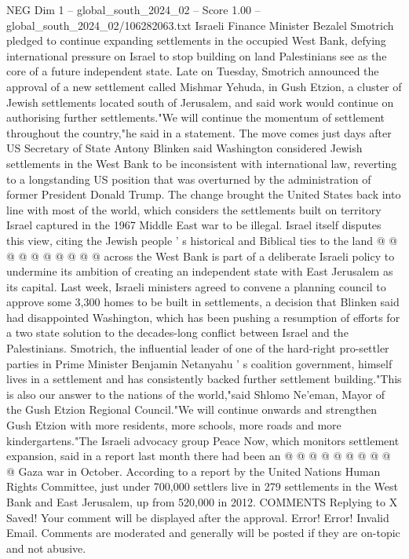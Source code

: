 \begin{textsample}{NEG Dim 1 – global\_south\_2024\_02 – Score 1.00 – global\_south\_2024\_02/106282063.txt}  \label{ex:f1_neg_419}
Israeli Finance Minister Bezalel Smotrich pledged to continue expanding settlements in the occupied West Bank, defying international pressure on Israel to stop building on land Palestinians see as the core of a future independent state.
Late on Tuesday, Smotrich announced the approval of a new settlement called Mishmar Yehuda, in Gush Etzion, a cluster of Jewish settlements located south of Jerusalem, and said work would continue on authorising further settlements."We will continue the momentum of settlement throughout the country,"he said in a statement.
The move comes just days after US Secretary of State Antony Blinken said Washington considered Jewish settlements in the West Bank to be inconsistent with international law, reverting to a longstanding US position that was overturned by the administration of former President Donald Trump.
The change brought the United States back into line with most of the world, which considers the settlements built on territory Israel captured in the 1967 Middle East war to be illegal.
Israel itself disputes this view, citing the Jewish people ' s historical and Biblical ties to the land @ @ @ @ @ @ @ @ @ @ across the West Bank is part of a deliberate Israeli policy to undermine its ambition of creating an independent state with East Jerusalem as its capital.
Last week, Israeli ministers agreed to convene a planning council to approve some 3,300 homes to be built in settlements, a decision that Blinken said had disappointed Washington, which has been pushing a resumption of efforts for a two state solution to the decades-long conflict between Israel and the Palestinians.
Smotrich, the influential leader of one of the hard-right pro-settler parties in Prime Minister Benjamin Netanyahu ' s coalition government, himself lives in a settlement and has consistently backed further settlement building."This is also our answer to the nations of the world,"said Shlomo Ne'eman, Mayor of the Gush Etzion Regional Council."We will continue onwards and strengthen Gush Etzion with more residents, more schools, more roads and more kindergartens."The Israeli advocacy group Peace Now, which monitors settlement expansion, said in a report last month there had been an @ @ @ @ @ @ @ @ @ @ Gaza war in October.
According to a report by the United Nations Human Rights Committee, just under 700,000 settlers live in 279 settlements in the West Bank and East Jerusalem, up from 520,000 in 2012.
COMMENTS Replying to X Saved!
Your comment will be displayed after the approval.
Error!
Error!
Invalid Email.
Comments are moderated and generally will be posted if they are on-topic and not abusive.

\end{textsample}

